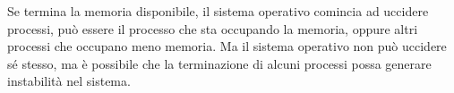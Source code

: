 \documentclass{article}
\numberwithin{equation}{subsection}
\begin{document}

Se termina la memoria disponibile, il sistema operativo comincia ad uccidere processi, può essere il processo che sta occupando la memoria, oppure 
altri processi che occupano meno memoria. Ma il sistema operativo non può uccidere sé stesso, ma è possibile che la terminazione di alcuni processi 
possa generare instabilità nel sistema. 

\clearpage
\end{document}
